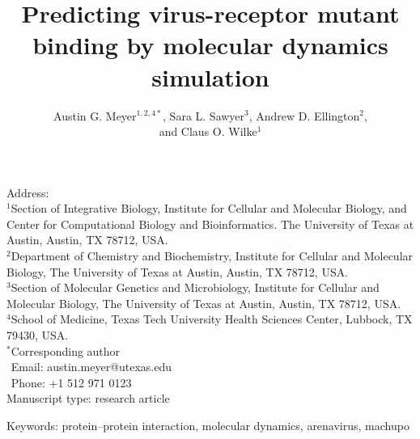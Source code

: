 \documentclass[12pt]{article}
\begin{document}
\title{\textbf{Predicting virus-receptor mutant binding by molecular dynamics simulation}}
\author{Austin G. Meyer$^{1,2,4*}$, Sara L. Sawyer$^{3}$, Andrew D. Ellington$^{2}$,\\and Claus O. Wilke$^{1}$}
\date{}

\maketitle
\noindent
Address:\\
$^1$Section of Integrative Biology, Institute for Cellular and Molecular
Biology, and Center for Computational Biology and Bioinformatics. The University
of Texas at Austin, Austin, TX 78712, USA.\\
$^2$Department of Chemistry and Biochemistry, Institute for Cellular and Molecular 
Biology, The University of Texas at Austin, Austin, TX 78712, USA.\\
$^3$Section of Molecular Genetics and Microbiology, Institute for Cellular and Molecular 
Biology, The University of Texas at Austin, Austin, TX 78712, USA.\\
$^4$School of Medicine, Texas Tech University Health Sciences Center, 
Lubbock, TX 79430, USA.\\

\bigskip
\noindent
$^*$Corresponding author\\
$\phantom{^*}$Email: austin.meyer@utexas.edu\\
$\phantom{^*}$Phone: +1 512 971 0123\\

\bigskip
\noindent
Manuscript type: research article

\bigskip
\noindent Keywords: protein--protein interaction, molecular dynamics, arenavirus, machupo

\newpage
\end{document}
